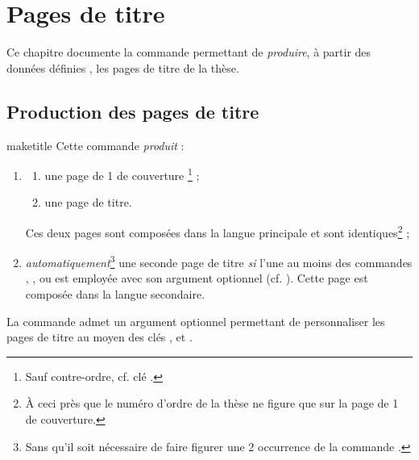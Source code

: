 \chapter{Pages de titre}\label{cha-pages-de-titre}

Ce chapitre documente la commande  permettant de
\emph{produire}, à partir des données définies ,
les pages de titre de la thèse.

\section{Production des pages de titre}

\begin{docCommand}[doc description=\mandatory]{maketitle}{}%
  Cette commande \emph{produit} :
  \begin{enumerate}
  \item
    \begin{enumerate}
    \item une page de 1\iere{} de couverture%
      \footnote{Sauf contre-ordre, cf. clé .} ;
    \item une page de titre.
    \end{enumerate}
    Ces deux pages sont composées dans la langue principale et
    sont identiques\footnote{À ceci près que le numéro d'ordre de la thèse ne figure
      que sur la page de 1\iere{} de couverture.} ;
  \item \emph{automatiquement}\footnote{Sans qu'il soit nécessaire de faire
      figurer une 2\ieme{} occurrence de la commande .} une
    seconde page de titre \emph{si}  l'une au moins des
    commandes , ,  ou
     est employée avec son argument optionnel
    (cf. ). Cette page est composée dans la langue
    secondaire.
  \end{enumerate}
\end{docCommand}

La commande  admet un argument optionnel permettant de
personnaliser les pages de titre au moyen des clés ,
 et .%
%
%
%

